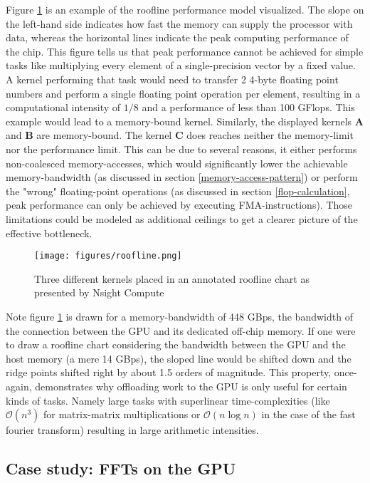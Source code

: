 \documentclass[english,11pt,a4paper,table]{article} %
\begin{document}
Figure \ref{roofline-example} is an example of the roofline performance model visualized.
The slope on the left-hand side indicates how fast the memory can supply the processor with data, whereas the horizontal lines indicate the peak computing performance of the chip.
This figure tells us that peak performance cannot be achieved for simple tasks like multiplying every element of a single-precision vector by a fixed value.
A kernel performing that task would need to transfer 2 4-byte floating point numbers and perform a single floating point operation per element, resulting in a computational intensity of $1/8$ and a performance of less than 100 GFlops.
This example would lead to a memory-bound kernel.
Similarly, the displayed kernels \textbf{A} and \textbf{B} are memory-bound.
The kernel \textbf{C} does reaches neither the memory-limit nor the performance limit.
This can be due to several reasons, it either performs non-coalesced memory-accesses, which would significantly lower the achievable memory-bandwidth (as discussed in section \ref{memory-access-pattern}) or perform the "wrong" floating-point operations (as discussed in section \ref{flop-calculation}, peak performance can only be achieved by executing FMA-instructions).
Those limitations could be modeled as additional ceilings to get a clearer picture of the effective bottleneck.

\begin{figure}[H]
	\centering
	\texttt{[image: figures/roofline.png]}
	\caption{Three different kernels placed in an annotated roofline chart as presented by Nsight Compute}
	\label{roofline-example}
\end{figure}

Note figure \ref{roofline-example} is drawn for a memory-bandwidth of 448 GBps, the bandwidth of the connection between the GPU and its dedicated off-chip memory.
If one were to draw a roofline chart considering the bandwidth between the GPU and the host memory (a mere 14 GBps), the sloped line would be shifted down and the ridge points shifted right by about 1.5 orders of magnitude.
This property, once-again, demonstrates why offloading work to the GPU is only useful for certain kinds of tasks.
Namely large tasks with superlinear time-complexities (like $\mathcal{O}(n^3)$ for matrix-matrix multiplications or $\mathcal{O}(n \log{n})$ in the case of the fast fourier transform) resulting in large arithmetic intensities.

\subsection{Case study: FFTs on the GPU}
\label{fft-case-study}
\end{document}
